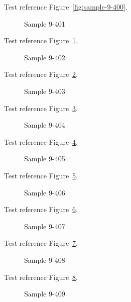 Test reference Figure~\ref{fig:sample-9-400}.

\begin{figure}[tbhp]
\caption{Sample 9-401}
\label{fig:sample-9-401}
\end{figure}

Test reference Figure~\ref{fig:sample-9-401}.

\begin{figure}[tbhp]
\caption{Sample 9-402}
\label{fig:sample-9-402}
\end{figure}

Test reference Figure~\ref{fig:sample-9-402}.

\begin{figure}[tbhp]
\caption{Sample 9-403}
\label{fig:sample-9-403}
\end{figure}

Test reference Figure~\ref{fig:sample-9-403}.

\begin{figure}[tbhp]
\caption{Sample 9-404}
\label{fig:sample-9-404}
\end{figure}

Test reference Figure~\ref{fig:sample-9-404}.

\begin{figure}[tbhp]
\caption{Sample 9-405}
\label{fig:sample-9-405}
\end{figure}

Test reference Figure~\ref{fig:sample-9-405}.

\begin{figure}[tbhp]
\caption{Sample 9-406}
\label{fig:sample-9-406}
\end{figure}

Test reference Figure~\ref{fig:sample-9-406}.

\begin{figure}[tbhp]
\caption{Sample 9-407}
\label{fig:sample-9-407}
\end{figure}

Test reference Figure~\ref{fig:sample-9-407}.

\begin{figure}[tbhp]
\caption{Sample 9-408}
\label{fig:sample-9-408}
\end{figure}

Test reference Figure~\ref{fig:sample-9-408}.

\begin{figure}[tbhp]
\caption{Sample 9-409}
\label{fig:sample-9-409}
\end{figure}

